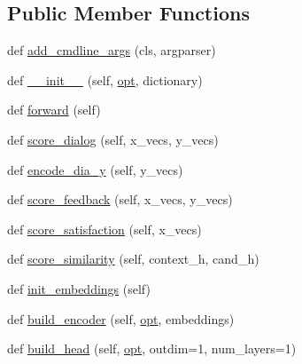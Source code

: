 \subsection*{Public Member Functions}
\begin{DoxyCompactItemize}
\item 
def \hyperlink{classprojects_1_1self__feeding_1_1modules_1_1SelfFeedingModel_abe11657258387d9ba0ca0f2afadc5ef0}{add\+\_\+cmdline\+\_\+args} (cls, argparser)
\item 
def \hyperlink{classprojects_1_1self__feeding_1_1modules_1_1SelfFeedingModel_ac3c3029e17b243c9552bbad70a9f8083}{\+\_\+\+\_\+init\+\_\+\+\_\+} (self, \hyperlink{classprojects_1_1self__feeding_1_1modules_1_1SelfFeedingModel_a86b883b434d874848d66e4ddcc4f1f50}{opt}, dictionary)
\item 
def \hyperlink{classprojects_1_1self__feeding_1_1modules_1_1SelfFeedingModel_a01b34826a6d6cd308f68d974125de0c5}{forward} (self)
\item 
def \hyperlink{classprojects_1_1self__feeding_1_1modules_1_1SelfFeedingModel_a6cd2fe02cf3a0e00413941b787406abe}{score\+\_\+dialog} (self, x\+\_\+vecs, y\+\_\+vecs)
\item 
def \hyperlink{classprojects_1_1self__feeding_1_1modules_1_1SelfFeedingModel_aac70a3595157ac4a601774d3d1bac35b}{encode\+\_\+dia\+\_\+y} (self, y\+\_\+vecs)
\item 
def \hyperlink{classprojects_1_1self__feeding_1_1modules_1_1SelfFeedingModel_af2728f78dcc8352369756ab123a93469}{score\+\_\+feedback} (self, x\+\_\+vecs, y\+\_\+vecs)
\item 
def \hyperlink{classprojects_1_1self__feeding_1_1modules_1_1SelfFeedingModel_a5657fa642e5449157c3be1c6e9f7c15d}{score\+\_\+satisfaction} (self, x\+\_\+vecs)
\item 
def \hyperlink{classprojects_1_1self__feeding_1_1modules_1_1SelfFeedingModel_aab1752ab5dcfc6b0c24b20c839285ee5}{score\+\_\+similarity} (self, context\+\_\+h, cand\+\_\+h)
\item 
def \hyperlink{classprojects_1_1self__feeding_1_1modules_1_1SelfFeedingModel_a027668f97ccbf2fe6dc6fcc2c408218b}{init\+\_\+embeddings} (self)
\item 
def \hyperlink{classprojects_1_1self__feeding_1_1modules_1_1SelfFeedingModel_a3a6660541d656fcc763ee0b712902e60}{build\+\_\+encoder} (self, \hyperlink{classprojects_1_1self__feeding_1_1modules_1_1SelfFeedingModel_a86b883b434d874848d66e4ddcc4f1f50}{opt}, embeddings)
\item 
def \hyperlink{classprojects_1_1self__feeding_1_1modules_1_1SelfFeedingModel_a1c493d21cd4aa3e296e5d2f1830c0b06}{build\+\_\+head} (self, \hyperlink{classprojects_1_1self__feeding_1_1modules_1_1SelfFeedingModel_a86b883b434d874848d66e4ddcc4f1f50}{opt}, outdim=1, num\+\_\+layers=1)
\end{DoxyCompactItemize}
